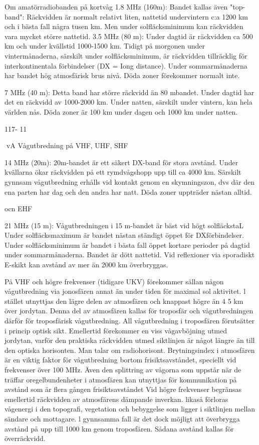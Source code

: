 Om amatörradiobanden på kortvåg
1.8 MHz (160m):
Bandet kallas även "top-band": Räckvidden
är normalt relativt liten, nattetid undervintern
c:a 1200 km och i bästa fall några tusen km.
Men under solfläcksminimum kan räckvidden vara mycket större nattetid.
3.5 MHz (80 m):
Under dagtid är räckvidden ca 500 km och
under kvällstid 1000-1500 km. Tidigt på
morgonen under vintermånaderna, särskilt
under solfläcksminimum, är räckvidden tillräcklig för interkontinentala förbindelser (DX
= Iong distance). Under sommarmånaderna
har bandet hög atmosfärisk brus nivå. Döda
zoner förekommer normalt inte.

7 MHz (40 m):
Detta band har större räckvidd än 80 mbandet. Under dagtid har det en räckvidd av
1000-2000 km. Under natten, särskilt under
vintern, kan hela världen nås. Döda zoner är
100 km under dagen och 1000 km under
natten.

117- 11

vA
Vågutbredning på VHF, UHF, SHF

14 MHz (20m):
20m-bandet är ett säkert DX-band för stora
avstånd. Under kvällarna ökar räckvidden
på ett rymdvågshopp upp till ca 4000 km.
Särskilt gynnsam vågutbredning erhålls vid
kontakt genom en skymningszon, dvs där
den ena parten har dag och den andra har
natt. Döda zoner uppträder nästan alltid.

ocn EHF

21 MHz (15 m):
Vågutbredningen i 15 m-bandet är bäst vid
högt solfläckstaL Under solfläcksmaximum
är bandet nästan ständigt öppet för DXförbindelser.
Under solfläcksminimum är bandet i bästa
fall öppet kortare perioder på dagtid under
sommarmånaderna.
Bandet är dött nattetid. Vid reflexioner via
sporadiskt E-skikt kan avstånd av mer än
2000 km överbryggas.

På VHF och högre frekvenser (tidigare UKV)
förekommer sällan någon vågutbredning via
jonosfären annat än under tiden för maximal
sol aktivitet. l stället utnyttjas den lägre delen
av atmosfären och knappast högre än 4 5
km över jordytan. Denna del av atmosfären
kallas för troposfär och vågutbredningen
därför för troposfärisk vågutbredning.
All vågutbredning i troposfären förutsätter i princip optisk sikt. Emellertid förekommer en viss vågavböjning utmed jordytan,
varför den praktiska räckvidden utmed siktlinjen är något längre än till den optiska
horisonten. Man talar om radiohorisont.
Brytningsindex i atmosfären är en viktig
faktor för vågutbredning bortom frisiktsavståndet, speciellt vid frekvenser över 100
MHz. Även den splittring av vågorna som
uppstår när de träffar oregelbundenheter i
atmosfären kan utnyttjas för kommunikation
på avstånd som är flera gången frisiktsavståndet
Vid högre frekvenser begränsas emellertid räckvidden av atmosfärens dämpande
inverkan. likaså förloras vågenergi i den
topografi, vegetation och bebyggelse som
ligger i siktlinjen mellan sändare och mottagare. l gynnsamma fall är det dock möjligt att
överbrygga avstånd på upp till 1000 km
genom troposfären. Sådana avstånd kallas
för överräckvidd.

